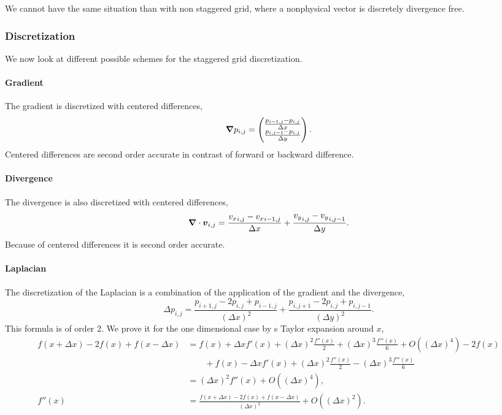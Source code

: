 We cannot have the same situation than with non staggered grid, where a nonphysical vector is discretely divergence free.

\subsubsection{Discretization}

We now look at different possible schemes for the staggered grid discretization.

\paragraph{Gradient}
\label{fixed:gradient}

The gradient is discretized with centered differences,
\begin{equation}
  {\boldsymbol {\nabla}}p_{i,j}=\begin{pmatrix}
                       	\frac{p_{i-1,j}-p_{i,j}}{\Delta x}\\
                       	\frac{p_{i,j-1}-p_{i,j}}{\Delta y}\\
                       \end{pmatrix}.
\end{equation}
Centered differences are second order accurate in contrast of forward or backward difference.

\paragraph{Divergence}
\label{fixed:divergence}

The divergence is also discretized with centered differences,
\begin{equation}
	{\boldsymbol {\nabla}}\cdot {\boldsymbol {v}}_{i,j}=\frac{{v_{x}}_{i,j}-{v_{x}}_{i-1,j}}{\Delta x}+\frac{{v_{y}}_{i,j}-{v_{y}}_{i,j-1}}{\Delta y}.
\end{equation}
Because of centered differences it is second order accurate.

\paragraph{Laplacian}
\label{fixed:Laplacian}

The discretization of the Laplacian is a combination of the application of the gradient and the divergence,
\begin{equation}
  \Delta p_{i,j}=\frac{p_{i+1,j}-2p_{i,j}+p_{i-1,j}}{(\Delta x)^2}+\frac{p_{i,j+1}-2p_{i,j}+p_{i,j-1}}{(\Delta y)^2}.
\end{equation}
This formula is of order 2.
We prove it for the one dimensional case by s Taylor expansion around $x$,
\begin{align*}
  f(x+\Delta x)-2f(x)+f(x-\Delta x)
  &=f(x)+\Delta x f'(x) +(\Delta x)^2 \frac{f''(x)}{2}+(\Delta x)^3 \frac{f'''(x)}{6}+O((\Delta x)^4)-2f(x)\\
  &\qquad+f(x)-\Delta x f'(x) +(\Delta x)^2 \frac{f''(x)}{2}-(\Delta x)^3 \frac{f'''(x)}{6}\\
  &=(\Delta x)^2f''(x) +O((\Delta x)^4),\\
  f''(x)&=\frac{f(x+\Delta x)-2f(x)+f(x-\Delta x)}{(\Delta x)^2}+O((\Delta x)^2).
\end{align*}

